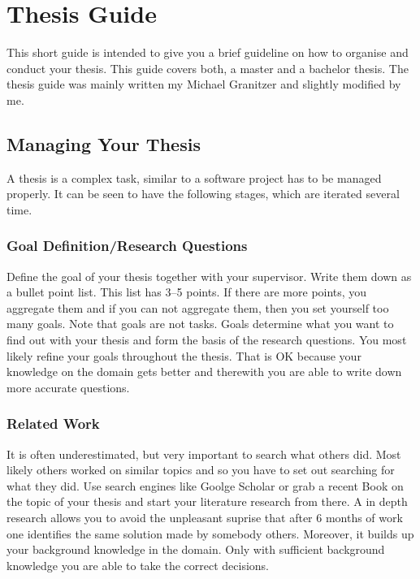 

\chapter{Thesis Guide}

This short guide is intended to give you a brief guideline on how to organise and conduct your thesis. This guide covers both, a master and a bachelor thesis.
The thesis guide was mainly written my Michael Granitzer and slightly modified by me. 

\section{Managing Your Thesis}
A thesis is a complex task, similar to a software project has to be managed properly. It can be seen to have the following stages, which are iterated several time.

\subsection{Goal Definition/Research Questions}

Define the goal of your thesis together with your supervisor. Write them down as a bullet point list. This list has 3--5 points. If there are more points, you aggregate them and if you can not aggregate them, then you set yourself too many goals. Note that goals are not tasks. Goals determine what you want to find out with your thesis and form the basis of the research questions. You most likely refine your goals throughout the thesis. That is OK because your knowledge on the domain gets better and therewith you are able to write down more accurate questions.

\subsection{Related Work}
It is often underestimated, but very important to search what others did. Most likely others worked on similar topics and so you have to set out searching for what they did. Use search engines like Goolge Scholar or grab a recent Book on the topic of your thesis and start your literature research from there. A in depth research allows you to avoid the unpleasant suprise that after 6 months of work one identifies the same solution made by somebody others. Moreover, it builds up your background knowledge in the domain. Only with sufficient background knowledge you are able to take the correct decisions.


